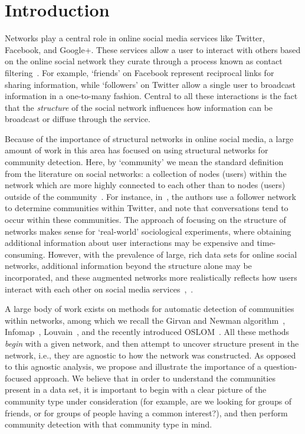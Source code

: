 \section{Introduction}

Networks play a central role in online social media services like Twitter, Facebook, and Google+. These services allow a user to interact with others based on the online social network they curate through a process known as contact filtering~\cite{cazabet2012automated}. For example, `friends' on Facebook represent reciprocal links for sharing information, while `followers' on Twitter allow a single user to broadcast information in a one-to-many fashion. Central to all these interactions is the fact that the \emph{structure} of the social network influences how information can be broadcast or diffuse through the service.

Because of the importance of structural networks in online social media, a large amount of work in this area has focused on using structural networks for community detection. Here, by `community' we mean the standard definition from the literature on social networks: a collection of nodes (users) within the network which are more highly connected to each other than to nodes (users) outside of the community~\cite{girvan2002a, newman2004finding}. For instance, in~\cite{java2009we}, the authors use a follower network to determine communities within Twitter, and note that conversations tend to occur within these communities. The approach of focusing on the structure of networks makes sense for `real-world' sociological experiments, where obtaining additional information about user interactions may be expensive and time-consuming. However, with the prevalence of large, rich data sets for online social networks, additional information beyond the structure alone may be incorporated, and these augmented networks more realistically reflects how users interact with each other on social media services~\cite{nguyen2011adaptive},~\cite{grabowicz2012social}.

A large body of work exists on methods for automatic detection of communities within networks, among which we recall the Girvan and Newman algorithm~\cite{newman2004finding}, Infomap~\cite{Rosvall08mapsof}, Louvain~\cite{blondel2008fast}, and the recently introduced OSLOM~\cite{LancichinettiPlos}.
All these methods \emph{begin} with a given network, and then attempt to uncover structure present in the network, i.e., they are agnostic to how the network was constructed. As opposed to this agnostic analysis, we propose and illustrate the importance of a question-focused approach. We believe that in order to understand the communities present in a data set, it is important to begin with a clear picture of the community type under consideration (for example, are we looking for groups of friends, or for groups of people having a common interest?), and then perform community detection with that community type in mind. 

